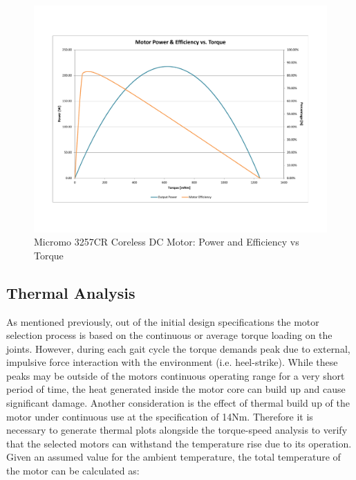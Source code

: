\begin{figure}[!ht]
	\begin{center}
    \includegraphics[trim = 20mm 30mm 20mm 30mm,clip,width=15cm]{fig/design/motor2.pdf}
	\end{center}
  \caption{Micromo 3257CR Coreless DC Motor: Power and Efficiency vs Torque}
\end{figure}


\subsection{Thermal Analysis} %
\label{sub:thermal_analysis}
As mentioned previously, out of the initial design specifications the motor selection process is based on the continuous or average torque loading on the joints. However, during each gait cycle the torque demands peak due to external, impulsive force interaction with the environment (i.e. heel-strike). While these peaks may be outside of the motors continuous operating range for a very short period of time, the heat generated inside the motor core can build up and cause significant damage. Another consideration is the effect of thermal build up of the motor under continuous use at the specification of 14Nm. Therefore it is necessary to generate thermal plots alongside the torque-speed analysis to verify that the selected motors can withstand the temperature rise due to its operation. Given an assumed value for the ambient temperature, the total temperature of the motor can be calculated as: 

